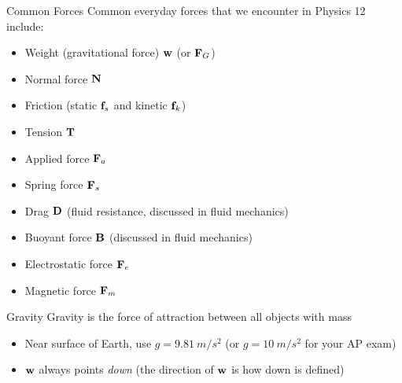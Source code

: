 \documentclass[12pt,compress,aspectratio=169]{beamer}
\newcommand{\mb}[1]{\ensuremath\mathbf{#1}}
\newcommand{\eq}[2]{\vspace{#1}{\Large\begin{displaymath}#2\end{displaymath}}}
\begin{document}
\begin{frame}{Common Forces}
  Common everyday forces that we encounter in Physics 12 include:
  \begin{itemize}
  \item Weight (gravitational force) $\mb{w}$ (or $\mb{F}_G$)
  \item Normal force $\mb{N}$
  \item Friction (static $\mb{f}_s$ and kinetic $\mb{f}_k$)
  \item Tension $\mb{T}$
  \item Applied force $\mb{F}_a$
  \item Spring force $\mb{F}_s$
  \item Drag $\mb{D}$ (fluid resistance, discussed in fluid mechanics)
  \item Buoyant force $\mb{B}$ (discussed in fluid mechanics)
  \item Electrostatic force $\mb{F}_e$
  \item Magnetic force $\mb{F}_m$
  \end{itemize}
\end{frame}



\begin{frame}{Gravity}
  Gravity is the force of attraction between all objects with mass
    
  \eq{-.2in}{
    \boxed{\mb{w}=m\mb{g}}
  }
  \begin{itemize}
  \item\vspace{-.15in}Near surface of Earth, use $g=\SI{9.81}{m/s^2}$ (or
    $g=\SI{10}{m/s^2}$ for your AP exam)
  \item $\mb{w}$ always points \emph{down} (the direction of $\mb{w}$ is how
    down is defined)
%
  \end{itemize}    
\end{frame}
\end{document}
